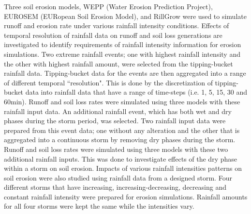 Three soil erosion models, WEPP (Water Erosion Prediction Project), EUROSEM
(EURopean Soil Erosion Model), and RillGrow were used to simulate runoff and
erosion rate under various rainfall intensity conditions. Effects of temporal
resolution of rainfall data on runoff and soil loss generations are
investigated to identify requirements of rainfall intensity information for
erosion simulations. Two extreme rainfall events; one with highest rainfall
intensity and the other with highest rainfall amount, were selected from the
tipping-bucket rainfall data. Tipping-bucket data for the events are then
aggregated into a range of different temporal ``resolution". This is done by
the discretization of tipping-bucket data into rainfall data that have a range
of time-steps (i.e. 1, 5, 15, 30 and 60min). Runoff and soil loss rates were
simulated using three models with these rainfall input data. An additional
rainfall event, which has both wet and dry phases during the storm period, was
selected. Two rainfall input data were prepared from this event data; one
without any alteration and the other that is aggregated into a continuous storm
by removing dry phases during the storm. Runoff and soil loss rates were
simulated using three models with these two additional rainfall inputs. This was
done to investigate effects of the dry phase within a storm on soil erosion.
Impacts of various rainfall intensities patterns on soil erosion were also
studied using rainfall data from a designed storm. Four different storms that
have increasing, increasing-decreasing, decreasing and constant rainfall
intensity were prepared for erosion simulations. Rainfall amounts for all four
storms were kept the same while the intensities vary.


